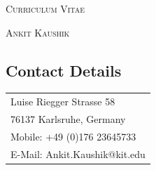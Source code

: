 \documentclass[11pt,a4paper]{article}
\begin{document}
\pagestyle{fancy}

\begin{center}
\huge{\textsc{Curriculum Vitae}}
\vspace{\baselineskip}

\Large{\textsc{Ankit Kaushik}}
\end{center}
\vspace{1.5\baselineskip}

\begin{center}
\begin{minipage}{1.0\textwidth}
\begin{minipage}{.50\textwidth}
\section{Contact Details}
\begin{minipage}{1.0\textwidth}
\begin{center}
\begin{minipage}{0.85\textwidth}
\begin{tabular}{l}
	Luise Riegger Strasse 58\\
	76137 Karlsruhe, Germany\\
	Mobile: +49 (0)176 23645733\\
	E-Mail: Ankit.Kaushik@kit.edu\\
\end{tabular}
\vspace{1.5\baselineskip}
\end{minipage}
\end{center}
\end{minipage}
\\
\begin{minipage}{0.85\textwidth}

\end{minipage}
\end{minipage}
\end{minipage}
\end{center}
\end{document}
